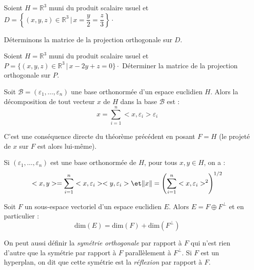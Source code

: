 \documentclass[french,11pt,twoside]{VcCours}
\begin{document}
\newpage
\begin{Exemple}{} Soient $H= \mathbb{R}^3$ muni du produit scalaire usuel et $D= \left\lbrace (x,y,z) \in \mathbb{R}^3 \, \vert \, x= \dfrac{y}{2} = \dfrac{z}{3} \right\rbrace \cdot$

Déterminons la matrice de la projection orthogonale sur $D$.

\vspace{10cm}
\end{Exemple}

\begin{ApplicationDirecte}{} Soient $H= \mathbb{R}^3$ muni du produit scalaire usuel et $P = \lbrace (x,y,z) \in \mathbb{R}^3 \, \vert \, x-2y+z=0 \rbrace \cdot$
Déterminer la matrice de la projection orthogonale sur $P$.
\end{ApplicationDirecte}

\begin{Proposition}{} Soit $\mathcal{B}= (\varepsilon_1, \ldots, \varepsilon_n)$ une base orthonormée d'un espace euclidien $H$. Alors la décomposition de tout vecteur $x$ de $H$ dans la base $\mathcal{B}$ est :
$$ x = \sum_{i=1}^n <x, \varepsilon_i> \varepsilon_i $$
\end{Proposition}

\begin{Demonstration}{} C'est une conséquence directe du théorème précédent en posant $F=H$ (le projeté de $x$ sur $F$ est alors lui-même).
\end{Demonstration}

\begin{Remarque}{} Si $(\varepsilon_1, \ldots, \varepsilon_n)$ est une base orthonormée de $H$, pour tous $x,y \in H$, on a :
$$ <x,y> = \sum_{i=1}^n <x,\varepsilon_i><y,\varepsilon_i> \et \Vert x \Vert = \left(\sum_{i=1}^n <x,\varepsilon_i>^2 \right)^{1/2}$$
\end{Remarque}

\begin{Proposition}{} Soit $F$ un sous-espace vectoriel d'un espace euclidien $E$. Alors $E= F \oplus F^{\perp}$ et en particulier :
$$   \textrm{dim}(E) = \textrm{dim}(F) + \textrm{dim}(F^{\perp})$$
\end{Proposition}

\begin{Remarque}{} On peut aussi définir la \emph{symétrie orthogonale} par rapport à $F$ qui n'est rien d'autre que la symétrie par rapport à $F$ parallèlement à $F^{\perp}$. Si $F$ est un hyperplan, on dit que cette symétrie est la \emph{réflexion} par rapport à $F$.
\end{Remarque}
\end{document}
